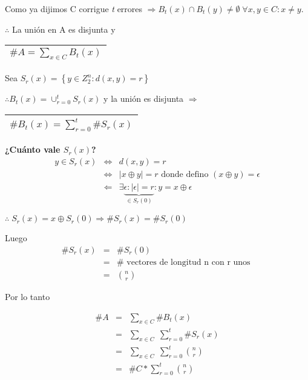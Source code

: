 \documentclass[12pt,a4paper]{report}
\newcounter{neq}
\begin{document}
		\vspace{3mm}
		Como ya dijimos C corrigue \textit{t} errores $\Rightarrow B_{t}(x) \cap B_{t}(y) \neq \emptyset \; \forall x, y \in C : x \neq y$.

		\begin{center}
		$\therefore$ La unión en A es disjunta y \begin{tabular}{|c|} \hline $ \#A = \sum_{x \in C} B_{t}(x) $ \\ \hline \end{tabular}
		\end{center}

		\vspace{3mm}
		Sea $S_{r}(x) = \left\lbrace y \in Z_{2}^{n} : d(x, y) = r \right\rbrace$

		\vspace{3mm}
		$\therefore B_{t}(x) = \cup_{r = 0}^{t}S_{r}(x)$ y la unión es disjunta $\Rightarrow$ \begin{tabular}{|c|} \hline $ \#B_{t}(x) = \sum_{r = 0}^{t}\#S_{r}(x) $ \\ \hline \end{tabular}

		\vspace{3mm}
		\textbf{¿Cuánto vale $S_{r}(x)$?}
		\begin{eqnarray}
			\nonumber y \in S_{r}(x) & \Leftrightarrow & d(x, y) = r \\
			\nonumber & \Leftrightarrow & \lvert x \oplus y \rvert = r \text{ donde defino } (x \oplus y) = \epsilon \\
			\nonumber & \Leftarrow & \exists \underbrace{\epsilon : \lvert \epsilon \rvert = r}_{\in S_{r}(0)} : y = x \oplus \epsilon
		\end{eqnarray}

		$\therefore \; S_{r}(x) = x \oplus S_{r}(0) \Rightarrow \#S_{r}(x) = \#S_{r}(0)$

		\vspace{3mm}
		Luego
		\begin{eqnarray}
			\nonumber \#S_{r}(x) &=& \#S_{r}(0) \\
			\nonumber &=& \# \text{ vectores de longitud n con r unos } \\
			\nonumber &=& {n \choose r}
		\end{eqnarray}

		Por lo tanto

		\begin{eqnarray}
			\nonumber \# A &=& \sum_{x \in C} \# B_{t}(x) \\
			\nonumber &=& \sum_{x \in C} \; \sum_{r= 0}^{t} \#S_{r}(x) \\
			\nonumber &=& \sum_{x \in C} \; \sum_{r = 0}^{t} {n \choose r} \\
			\nonumber &=& \# C * \sum_{r = 0}^{t} {n \choose r}
		\end{eqnarray}
\end{document}
